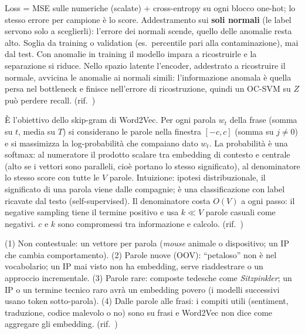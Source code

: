 \begin{soluzione}[A16 -- Autoencoder]
Loss = MSE sulle numeriche (scalate) + cross-entropy su ogni blocco one-hot; lo stesso errore per campione
        è lo score. Addestramento sui \textbf{soli normali} (le label servono solo a sceglierli): l'errore dei normali scende, quello delle
        anomalie resta alto. Soglia da training o validation (es.\ percentile pari alla contaminazione), mai dal test. Con anomalie in
        training il modello impara a ricostruirle e la separazione si riduce. Nello spazio latente l'encoder, addestrato a ricostruire il
        normale, avvicina le anomalie ai normali simili: l'informazione anomala è quella persa nel bottleneck e finisce nell'errore di
        ricostruzione, quindi un OC-SVM su $Z$ può perdere recall.
(rif.\ )
\end{soluzione}

\begin{soluzione}
È l'obiettivo dello skip-gram di Word2Vec. Per ogni parola $w_t$ della frase (somma su $t$, media su $T$) si considerano le parole nella
finestra $[-c, c]$ (somma su $j \ne 0$) e si massimizza la log-probabilità che compaiano dato $w_t$. La probabilità è una softmax: al
numeratore il prodotto scalare tra embedding di contesto e centrale (alto se i vettori sono paralleli, cioè portano lo stesso
significato), al denominatore lo stesso score con tutte le $V$ parole. Intuizione: ipotesi distribuzionale, il significato di una parola
viene dalle compagnie; è una classificazione con label ricavate dal testo (self-supervised). Il denominatore costa $O(V)$ a ogni passo:
il negative sampling tiene il termine positivo e usa $k \ll V$ parole casuali come negativi. $c$ e $k$ sono compromessi tra informazione
e calcolo.
(rif.\ )
\end{soluzione}

\begin{soluzione}
(1) Non contestuale: un vettore per parola (\emph{mouse} animale o dispositivo; un IP che cambia comportamento). (2) Parole nuove (OOV):
``petaloso'' non è nel vocabolario; un IP mai visto non ha embedding, serve riaddestrare o un approccio incrementale. (3) Parole rare:
composte tedesche come \emph{Sitzpinkler}; un IP o un termine tecnico raro avrà un embedding povero (i modelli successivi usano token
sotto-parola). (4) Dalle parole alle frasi: i compiti utili (sentiment, traduzione, codice malevolo o no) sono su frasi e Word2Vec non
dice come aggregare gli embedding.
(rif.\ )
\end{soluzione}

